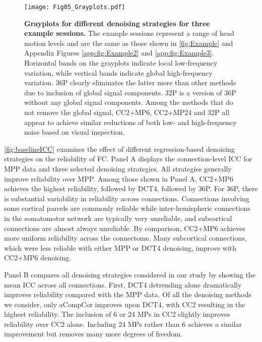 \documentclass{article}
\begin{document}
\begin{figure}
{
    \centering
    \texttt{[image: Fig05\_Grayplots.pdf]}
    }
    \caption{\small
    \textbf{Grayplots for different denoising strategies for three example sessions.} The example sessions represent a range of head motion levels and are the same as those shown in \autoref{fig:Example} and Appendix Figures \ref{app:fig:Example2} and \ref{app:fig:Example3}. Horizontal bands on the grayplots indicate local low-frequency variation, while vertical bands indicate global high-frequency variation. 36P clearly eliminates the latter more than other methods due to inclusion of global signal components. 32P is a version of 36P without any global signal components. Among the methods that do not remove the global signal, CC2+MP6, CC2+MP24 and 32P all appear to achieve similar reductions of both low- and high-frequency noise based on visual inspection.}
    \label{fig:grayplots}
\end{figure}

\autoref{fig:baselineICC} examines the effect of different regression-based denoising strategies on the reliability of FC. Panel A displays the connection-level ICC for MPP data and three selected denoising strategies. All strategies generally improve reliability over MPP. Among those shown in Panel A, CC2+MP6 achieves the highest reliability, followed by DCT4, followed by 36P. For 36P, there is substantial variability in reliability across connections. Connections involving some cortical parcels are commonly reliable while inter-hemispheric connections in the somatomotor network are typically very unreliable, and subcortical connections are almost always unreliable. By comparison, CC2+MP6 achieves more uniform reliability across the connectome. Many subcortical connections, which were less reliable with either MPP or DCT4 denoising, improve with CC2+MP6 denoising. 

Panel B compares all denoising strategies considered in our study by showing the mean ICC across all connections. %
First, DCT4 detrending alone dramatically improves reliability compared with the MPP data. Of all the denoising methods we consider, only aCompCor improves upon DCT4, with CC2 resulting in the highest reliability. The inclusion of 6 or 24 MPs in CC2 slightly improves reliability over CC2 alone. Including 24 MPs rather than 6 achieves a similar improvement but removes many more degrees of freedom. 
\end{document}
